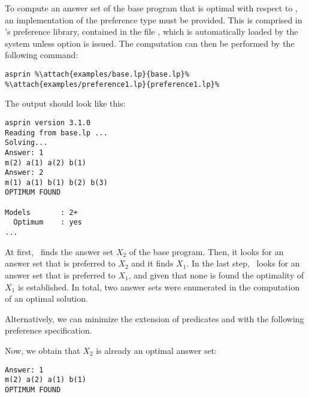 \begin{example}
To compute an answer set of the base program that is optimal with respect to , 
an implementation of the preference type  must be provided.
This is comprised in \asprin's preference library,
contained in the file ,
which is automatically loaded by the system unless option  is issued.
The computation can then be performed by the following command:
%
\begin{lstlisting}[numbers=none,escapechar=\%]
asprin %\attach{examples/base.lp}{base.lp}% %\attach{examples/preference1.lp}{preference1.lp}% 
\end{lstlisting}
%
The output should look like this:
%
\begin{lstlisting}[numbers=none]
asprin version 3.1.0
Reading from base.lp ...
Solving...
Answer: 1
m(2) a(1) a(2) b(1)
Answer: 2
m(1) a(1) b(1) b(2) b(3)
OPTIMUM FOUND

Models       : 2+
  Optimum    : yes
...
\end{lstlisting}
%
At first, \asprin\ finds the answer set $X_2$ of the base program. 
Then, it looks for an answer set that is preferred to $X_2$ and it finds $X_1$. 
In the last step, \asprin\ looks for an answer set that is preferred to $X_1$,  
and given that none is found the optimality of $X_1$ is established. 
In total, two answer sets were enumerated in the computation of an optimal solution.

Alternatively,
we can minimize the extension of predicates  and  with the following preference specification.
%

%
Now, we obtain that $X_2$ is already an optimal answer set: 
\begin{lstlisting}[numbers=none]
Answer: 1
m(2) a(2) a(1) b(1)
OPTIMUM FOUND
\end{lstlisting}
\end{example}

